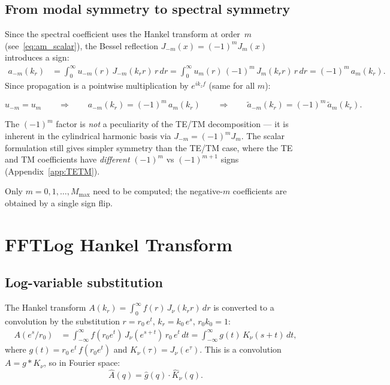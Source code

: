\documentclass[11pt,a4paper]{article}
\begin{document}
\subsection{From modal symmetry to spectral symmetry}

Since the spectral coefficient uses the Hankel transform at order~$m$
(see~\eqref{eq:am_scalar}), the Bessel reflection $J_{-m}(x) = (-1)^m J_m(x)$
introduces a sign:
\begin{align}
  a_{-m}(k_r)
  &= \int_0^\infty u_{-m}(r)\,J_{-m}(k_r r)\,r\,dr
  = \int_0^\infty u_m(r)\,(-1)^m\,J_m(k_r r)\,r\,dr
  = (-1)^m\,a_m(k_r).
\end{align}
Since propagation is a pointwise multiplication by $e^{ik_z f}$ (same for all $m$):

\begin{tcolorbox}[title=Scalar symmetry]
\begin{equation}\label{eq:scalar_sym}
  u_{-m} = u_m
  \qquad\Longrightarrow\qquad
  a_{-m}(k_r) = (-1)^m\,a_m(k_r)
  \qquad\Longrightarrow\qquad
  \tilde a_{-m}(k_r) = (-1)^m\,\tilde a_m(k_r).
\end{equation}
\end{tcolorbox}

\noindent
The $(-1)^m$ factor is \emph{not} a peculiarity of the TE/TM decomposition ---
it is inherent in the cylindrical harmonic basis via
$J_{-m} = (-1)^m J_m$.  The scalar formulation still gives simpler symmetry
than the TE/TM case, where the TE and TM coefficients have \emph{different}
$(-1)^m$ vs $(-1)^{m+1}$ signs (Appendix~\ref{app:TETM}).

Only $m = 0, 1, \ldots, M_{\max}$ need to be computed; the negative-$m$
coefficients are obtained by a single sign flip.


\section{FFTLog Hankel Transform}
\label{sec:fftlog}

\subsection{Log-variable substitution}

The Hankel transform $A(k_r) = \int_0^\infty f(r)\,J_\nu(k_r r)\,dr$
is converted to a convolution by the substitution $r = r_0\,e^t$,
$k_r = k_0\,e^s$, $r_0 k_0 = 1$:
\begin{align}
  A(e^s/r_0)
  &= \int_{-\infty}^{\infty} f(r_0 e^t)\,J_\nu(e^{s+t})\,r_0\,e^t\,dt
  = \int_{-\infty}^{\infty} g(t)\,K_\nu(s+t)\,dt,
\end{align}
where $g(t) = r_0\,e^t\,f(r_0 e^t)$ and $K_\nu(\tau) = J_\nu(e^\tau)$.
This is a convolution $A = g * K_\nu$, so in Fourier space:
\begin{equation}
  \hat A(q) = \hat g(q)\cdot\hat K_\nu(q).
\end{equation}
\end{document}
